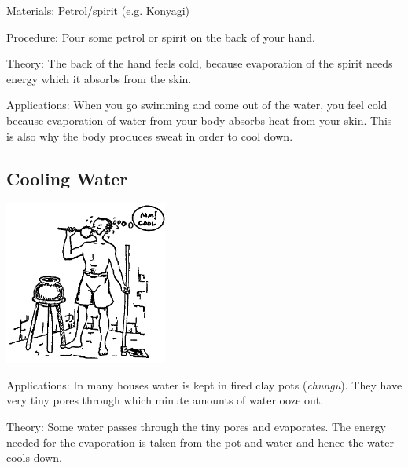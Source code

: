 \begin{multicols}{2}
\begin{description*}
\item[Materials:]{Petrol/spirit (e.g. Konyagi)}
\item[Procedure:]{Pour some petrol or spirit on the back of your hand.}
\item[Theory:]{The back of the hand feels cold, because evaporation of the spirit needs energy which it absorbs from the skin.}
\item[Applications:]{When you go swimming and come out of the water, you feel cold because evaporation of water from your body absorbs heat from your skin. This is also why the body produces sweat in order to cool down.}
\end{description*}

\subsection{Cooling Water}

\begin{center}
\includegraphics[width=0.4\textwidth]{./img/source/cooling-water.png}
\end{center}

\begin{description*}
\item[Applications:]{In many houses water is kept in fired clay pots (\emph{chungu}). They have very tiny pores through which minute amounts of water ooze out.}
\item[Theory:]{Some water passes through the tiny pores and evaporates. The energy needed for the evaporation is taken from the pot and water and hence the water cools down.}
\end{description*}


\end{multicols}
